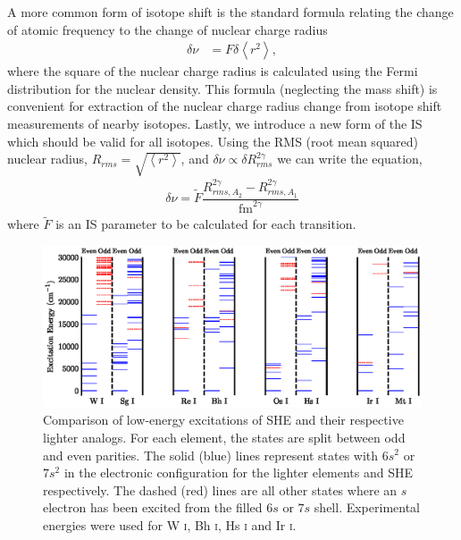 \documentclass[10pt,a4paper, twoside, openright]{report}
\begin{document}
 A more common form of isotope shift is the standard formula relating the change of atomic frequency to the change of nuclear charge radius
\begin{align} \label{eq:isoF}
\delta \nu &= F\delta \left<r^{2}\right>,
\end{align}
where the square of the nuclear charge radius is calculated using the Fermi distribution for the nuclear density. This formula (neglecting the mass shift) is convenient for extraction of the nuclear charge radius change from isotope shift measurements of nearby isotopes. Lastly, we introduce a new form of the IS which should be valid for all isotopes. Using  the RMS (root mean squared) nuclear radius, $ R_{rms} = \sqrt{\left<r^{2}\right>}$,  and $\delta \nu \propto \delta R_{rms}^{2\gamma}$ \cite{FGV2018} we can write the equation,
\begin{align}\label{eq:isoFtilde}
\delta \nu = \tilde{F}\dfrac{R_{rms,A_2}^{2\gamma} - R_{rms,A_1}^{2\gamma}}{\text{fm}^{2\gamma}}
\end{align}
where $\tilde{F}$ is an IS parameter to be calculated for each transition.
\begin{landscape}
\begin{figure}
\centering
\includegraphics[scale=1]{./figures/Sg_Mt_Energy_Plot.eps} 
\caption[Low-energy excitation comparison between SHE and each respective lighter analog.]{Comparison of low-energy excitations of SHE and their respective lighter analogs. For each element, the states are split between odd and even parities. The solid (blue) lines represent states with $6s^2$ or $7s^2$ in the electronic configuration for the lighter elements and SHE respectively. The dashed (red) lines are all other states where an $s$ electron has been excited from the filled $6s$ or $7s$ shell. Experimental energies were used for W \textsc{i}, Bh \textsc{i}, Hs \textsc{i} and Ir \textsc{i}. \cite{NIST_ASD}\label{fig:EL}}
\end{figure}
\end{landscape}
\end{document}
